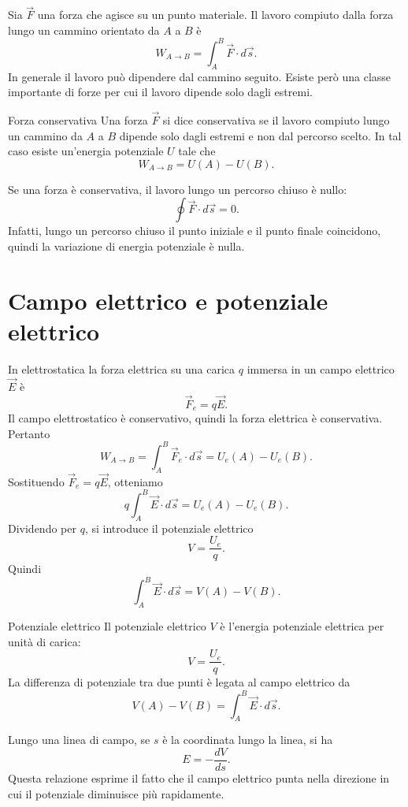 \documentclass[a4paper]{article}
\begin{document}
Sia \(\vec{F}\) una forza che agisce su un punto materiale. Il lavoro compiuto dalla forza lungo un cammino orientato da \(A\) a \(B\) è
\[
    W_{A\to B}=\int_A^B \vec{F}\cdot d\vec{s}.
\]
In generale il lavoro può dipendere dal cammino seguito. Esiste però una classe importante di forze per cui il lavoro dipende solo dagli estremi.

\begin{snippetdefinition}{Forza conservativa}
    Una forza \(\vec{F}\) si dice conservativa se il lavoro compiuto lungo un cammino da \(A\) a \(B\) dipende solo dagli estremi e non dal percorso scelto.
    In tal caso esiste un'energia potenziale \(U\) tale che
    \[
        W_{A\to B}=U(A)-U(B).
    \]
\end{snippetdefinition}

Se una forza è conservativa, il lavoro lungo un percorso chiuso è nullo:
\[
    \oint \vec{F}\cdot d\vec{s}=0.
\]
Infatti, lungo un percorso chiuso il punto iniziale e il punto finale coincidono, quindi la variazione di energia potenziale è nulla.

\section{Campo elettrico e potenziale elettrico}

In elettrostatica la forza elettrica su una carica \(q\) immersa in un campo elettrico \(\vec{E}\) è
\[
    \vec{F}_e=q\vec{E}.
\]
Il campo elettrostatico è conservativo, quindi la forza elettrica è conservativa. Pertanto
\[
    W_{A\to B}=\int_A^B \vec{F}_e\cdot d\vec{s}=U_e(A)-U_e(B).
\]
Sostituendo \(\vec{F}_e=q\vec{E}\), otteniamo
\[
    q\int_A^B \vec{E}\cdot d\vec{s}=U_e(A)-U_e(B).
\]
Dividendo per \(q\), si introduce il potenziale elettrico
\[
    V=\frac{U_e}{q}.
\]
Quindi
\[
    \int_A^B \vec{E}\cdot d\vec{s}=V(A)-V(B).
\]

\begin{snippetdefinition}{Potenziale elettrico}
    Il potenziale elettrico \(V\) è l'energia potenziale elettrica per unità di carica:
    \[
        V=\frac{U_e}{q}.
    \]
    La differenza di potenziale tra due punti è legata al campo elettrico da
    \[
        V(A)-V(B)=\int_A^B \vec{E}\cdot d\vec{s}.
    \]
\end{snippetdefinition}

Lungo una linea di campo, se \(s\) è la coordinata lungo la linea, si ha
\[
    E=-\frac{dV}{ds}.
\]
Questa relazione esprime il fatto che il campo elettrico punta nella direzione in cui il potenziale diminuisce più rapidamente.
\end{document}
